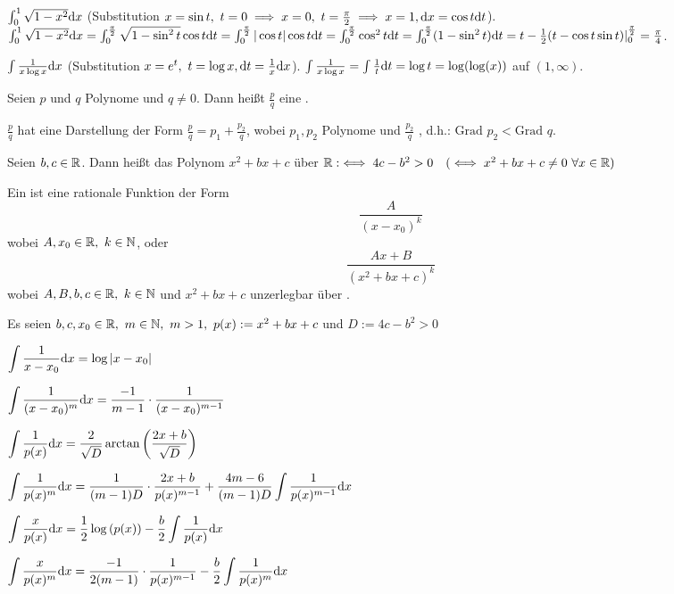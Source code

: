 \documentclass[a4paper,oneside,DIV15,BCOR12mm]{scrbook}
\begin{document}
\begin{beispiele}
\item $\int_0^1\sqrt{1-x^2}\text{d}x$ (Substitution $x=\sin t,\ t=0\folgt x=0,\ t=\frac{\pi}{2}\folgt x=1,\dx=\cos t\dt$). $\int_0^1\sqrt{1-x^2}\text{d}x=\int_0^{\frac{\pi}{2}}\sqrt{1-\sin^2 t}\cos t\text{d}t=\int_0^\frac{\pi}{2}|\cos t|\cos t\text{d}t=\int_0^{\frac{\pi}{2}}\cos^2t\text{d}t=\int_0^{\frac{\pi}{2}}(1-\sin^2t)\text{d}t=t-\frac{1}{2}(t-\cos t\sin t)|_0^{\frac{\pi}{2}}=\frac{\pi}{4}$.
\item $\int\frac{1}{x\log x}\text{d}x$ (Substitution $x=e^t,\ t=\log x,\text{d}t=\frac{1}{x}\text{d}x$). $\int\frac{1}{x\log x}=\int\frac{1}{t}\text{d}t=\log t=\log(\log(x))$ auf $(1,\infty)$.
\end{beispiele}

\begin{definition}
\begin{liste}
\item Seien $p$ und $q$ Polynome und $q \neq 0.$ Dann heißt $\frac{p}{q}$ eine .

$\frac{p}{q}$ hat eine Darstellung der Form $\frac{p}{q} = p_1 + \frac{p_2}{q}$, wobei $p_1,p_2$ Polynome und $\frac{p_2}{q}$ , d.h.: $\text{Grad } p_2 < \text{Grad } q$.

\item Seien $b,c \in \mathbb{R}$. Dann heißt das Polynom $x^2+bx+c$  über $\mathbb{R} :\iff 4c-b^2 > 0\quad(\iff x^2+bx+c \ne 0\ \forall x \in \mathbb{R})$

\item Ein  ist eine rationale Funktion der Form $$\frac{A}{(x-x_0)^k}$$wobei $A,x_0 \in \mathbb{R},\ k \in \mathbb{N}$, oder $$\frac{Ax+B}{(x^2+bx+c)^k}$$wobei $A,B,b,c \in \mathbb{R},\ k \in \mathbb{N}$ und $x^2+bx+c$ unzerlegbar über \MdR.
\end{liste}
\end{definition}

\newcommand{\fint}[2]{\int{\frac{#1}{#2}\dx}}

\begin{satz}
Es seien $b,c,x_0 \in \mathbb{R},\ m \in \mathbb{N},\ m > 1,\ p(x) := x^2+bx+c$ und $D := 4c-b^2 > 0$
\begin{liste}
\item $\displaystyle{\fint{1}{x-x_0} = \log{|x-x_0|}}$
\item $\displaystyle{\fint{1}{(x-x_0)^m} = \frac{-1}{m-1} \cdot \frac{1}{(x-x_0)^{m-1}}}$
\item $\displaystyle{\fint{1}{p(x)} = \frac{2}{\sqrt{D}} \arctan{\left( \frac{2x+b}{\sqrt{D}} \right)}}$
\item $\displaystyle{\fint{1}{p(x)^m} = \frac{1}{(m-1)D} \cdot \frac{2x+b}{p(x)^{m-1}} + \frac{4m-6}{(m-1)D} \fint{1}{p(x)^{m-1}}}$
\item $\displaystyle{\fint{x}{p(x)} = \frac{1}{2} \log{(p(x))} - \frac{b}{2} \fint{1}{p(x)}}$
\item $\displaystyle{\fint{x}{p(x)^m} = \frac{-1}{2(m-1)} \cdot \frac{1}{p(x)^{m-1}} - \frac{b}{2} \fint{1}{p(x)^m}}$
\end{liste}
\end{satz}
\end{document}

